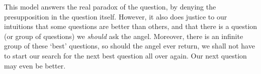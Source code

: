 This model answers the real paradox of the question, by denying the presupposition in the question itself.
However, it also does justice to our intuitions that some questions are better than others, and that there is a question (or group of questions) we \emph{should} ask the angel.
Moreover, there is an infinite group of these `best' questions, so should the angel ever return, we shall not have to start our search for the next best question all over again.
Our next question may even be better.
